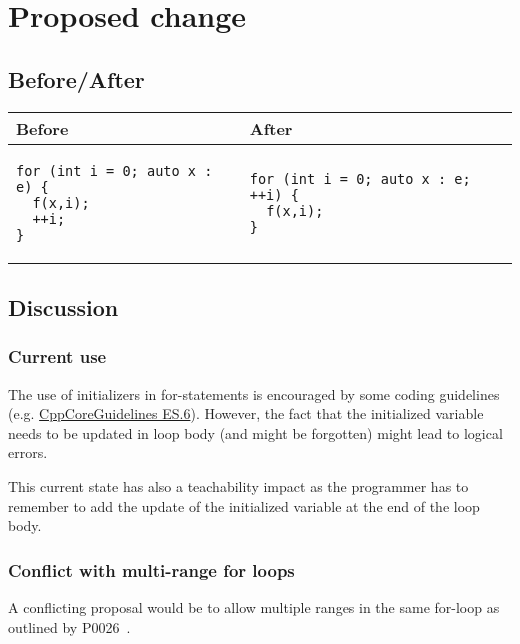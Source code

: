 \section{Proposed change}

\subsection{Before/After}

\begin{center}
\begin{tabular}{|p{}|p{}|}
\hline
\textbf{Before} & \textbf{After}\\
\hline
\begin{lstlisting}
for (int i = 0; auto x : e) {
  f(x,i);
  ++i;
}
\end{lstlisting}
&
\begin{lstlisting}
for (int i = 0; auto x : e; ++i) {
  f(x,i);
}
\end{lstlisting}
\\
\hline
\end{tabular}
\end{center}

\subsection{Discussion}

\subsubsection{Current use}

The use of initializers in for-statements is encouraged by some coding guidelines
(e.g.
\href{https://isocpp.github.io/CppCoreGuidelines/CppCoreGuidelines#es6-declare-names-in-for-statement-initializers-and-conditions-to-limit-scope}{CppCoreGuidelines
ES.6}). However, the fact that the initialized variable needs to be updated in
loop body (and might be forgotten) might lead to logical errors.

This current state has also a teachability impact as the programmer has to
remember to add the update of the initialized variable at the end of the loop
body.

\subsubsection{Conflict with multi-range for loops}

A conflicting proposal would be to allow multiple ranges in the same for-loop as
outlined by P0026~\cite{p0026}. 

